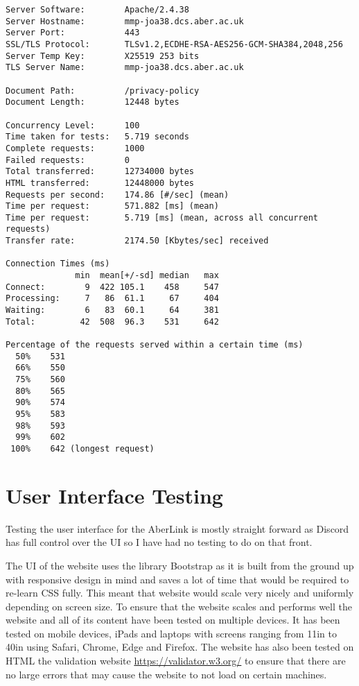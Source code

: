 \begin{verbatim}
Server Software:        Apache/2.4.38
Server Hostname:        mmp-joa38.dcs.aber.ac.uk
Server Port:            443
SSL/TLS Protocol:       TLSv1.2,ECDHE-RSA-AES256-GCM-SHA384,2048,256
Server Temp Key:        X25519 253 bits
TLS Server Name:        mmp-joa38.dcs.aber.ac.uk

Document Path:          /privacy-policy
Document Length:        12448 bytes

Concurrency Level:      100
Time taken for tests:   5.719 seconds
Complete requests:      1000
Failed requests:        0
Total transferred:      12734000 bytes
HTML transferred:       12448000 bytes
Requests per second:    174.86 [#/sec] (mean)
Time per request:       571.882 [ms] (mean)
Time per request:       5.719 [ms] (mean, across all concurrent requests)
Transfer rate:          2174.50 [Kbytes/sec] received

Connection Times (ms)
              min  mean[+/-sd] median   max
Connect:        9  422 105.1    458     547
Processing:     7   86  61.1     67     404
Waiting:        6   83  60.1     64     381
Total:         42  508  96.3    531     642

Percentage of the requests served within a certain time (ms)
  50%    531
  66%    550
  75%    560
  80%    565
  90%    574
  95%    583
  98%    593
  99%    602
 100%    642 (longest request)
\end{verbatim}

\section{User Interface Testing}
Testing the user interface for the AberLink is mostly straight forward as Discord has full control over the UI so I have had no testing to do on that front.

The UI of the website uses the library Bootstrap \cite{bootstrap} as it is built from the ground up with responsive design in mind and saves a lot of time that would be required to re-learn CSS fully. This meant that website would scale very nicely and uniformly depending on screen size. To ensure that the website scales and performs well the website and all of its content have been tested on multiple devices. It has been tested on mobile devices, iPads and laptops with screens ranging from 11in to 40in using Safari, Chrome, Edge and Firefox. The website has also been tested on HTML the validation website \href{https://validator.w3.org/}{https://validator.w3.org/} to ensure that there are no large errors that may cause the website to not load on certain machines.

